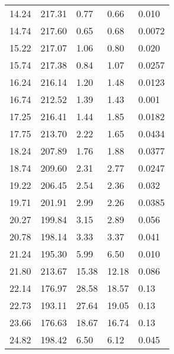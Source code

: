 \documentclass{aa}
\begin{document}
\begin{appendix}
\begin{table}
\begin{tabular}{lllll}
14.24 & 217.31 & 0.77 & 0.66 &  0.010 \\
14.74 & 217.60 & 0.65 & 0.68 &  0.0072 \\
15.22 & 217.07 & 1.06 & 0.80 &  0.020 \\
15.74 & 217.38 & 0.84 & 1.07 &  0.0257 \\
16.24 & 216.14 & 1.20 & 1.48 &  0.0123 \\
16.74 & 212.52 & 1.39 & 1.43 &  0.001 \\
17.25 & 216.41 & 1.44 & 1.85 &  0.0182 \\
17.75 & 213.70 & 2.22 & 1.65 &  0.0434 \\
18.24 & 207.89 & 1.76 & 1.88 &  0.0377 \\
18.74 & 209.60 & 2.31 & 2.77 &  0.0247 \\
19.22 & 206.45 & 2.54 & 2.36 &  0.032 \\
19.71 & 201.91 & 2.99 & 2.26 &  0.0385 \\
20.27 & 199.84 & 3.15 & 2.89 &  0.056 \\
20.78 & 198.14 & 3.33 & 3.37 &  0.041 \\
21.24 & 195.30 & 5.99 & 6.50 &  0.010 \\
21.80 & 213.67 & 15.38 & 12.18 & 0.086 \\
22.14 & 176.97 & 28.58 & 18.57 & 0.13 \\
22.73 & 193.11 & 27.64 & 19.05 & 0.13 \\
23.66 & 176.63 & 18.67 & 16.74 & 0.13 \\
24.82 & 198.42 & 6.50 & 6.12 & 0.045 \\
\hline
\end{tabular}
\end{table}
\end{appendix}
\end{document}
